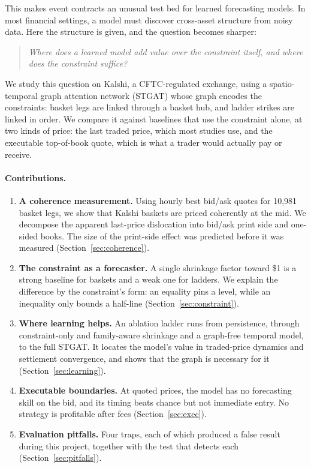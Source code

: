 \documentclass[11pt,a4paper]{article}
\begin{document}
This makes event contracts an unusual test bed for learned forecasting models. In
most financial settings, a model must discover cross-asset structure from noisy
data. Here the structure is given, and the question becomes sharper:
\begin{quote}
\emph{Where does a learned model add value over the constraint itself, and where
does the constraint suffice?}
\end{quote}

We study this question on Kalshi, a CFTC-regulated exchange, using a
spatio-temporal graph attention network (STGAT) whose graph encodes the
constraints: basket legs are linked through a basket hub, and ladder strikes are
linked in order. We compare it against baselines that use the constraint alone,
at two kinds of price: the last traded price, which most studies use, and the
executable top-of-book quote, which is what a trader would actually pay or
receive.

\paragraph{Contributions.}
\begin{enumerate}
  \item \textbf{A coherence measurement.} Using hourly best bid/ask quotes for
    10{,}981 basket legs, we show that Kalshi baskets are priced coherently at the
    mid. We decompose the apparent last-price dislocation into bid/ask print side
    and one-sided books. The size of the print-side effect was predicted before it
    was measured (Section~\ref{sec:coherence}).
  \item \textbf{The constraint as a forecaster.} A single shrinkage factor toward
    \$1 is a strong baseline for baskets and a weak one for ladders. We explain the
    difference by the constraint's form: an equality pins a level, while an
    inequality only bounds a half-line (Section~\ref{sec:constraint}).
  \item \textbf{Where learning helps.} An ablation ladder runs from persistence,
    through constraint-only and family-aware shrinkage and a graph-free temporal
    model, to the full STGAT. It locates the model's value in traded-price
    dynamics and settlement convergence, and shows that the graph is necessary
    for it (Section~\ref{sec:learning}).
  \item \textbf{Executable boundaries.} At quoted prices, the model has no
    forecasting skill on the bid, and its timing beats chance but not immediate
    entry. No strategy is profitable after fees (Section~\ref{sec:exec}).
  \item \textbf{Evaluation pitfalls.} Four traps, each of which produced a false
    result during this project, together with the test that detects each
    (Section~\ref{sec:pitfalls}).
\end{enumerate}
\end{document}
